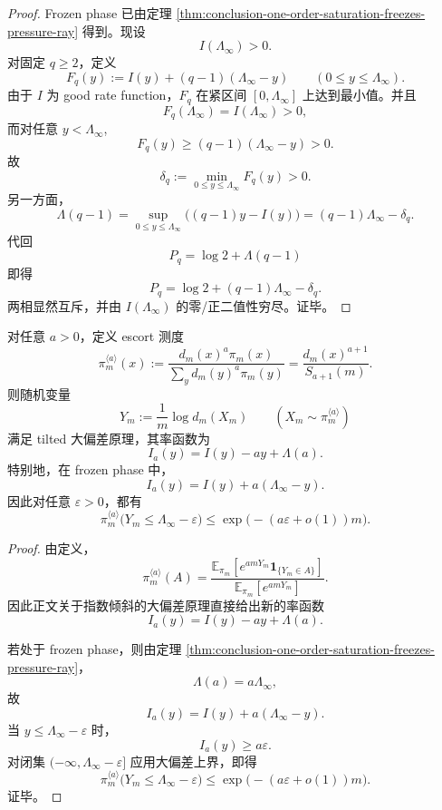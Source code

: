 \begin{proof}
Frozen phase 已由定理 \ref{thm:conclusion-one-order-saturation-freezes-pressure-ray} 得到。现设
\[
I(\Lambda_\infty)>0.
\]
对固定 \(q\ge 2\)，定义
\[
F_q(y):=I(y)+(q-1)(\Lambda_\infty-y)
\qquad (0\le y\le \Lambda_\infty).
\]
由于 \(I\) 为 good rate function，\(F_q\) 在紧区间 \([0,\Lambda_\infty]\) 上达到最小值。并且
\[
F_q(\Lambda_\infty)=I(\Lambda_\infty)>0,
\]
而对任意 \(y<\Lambda_\infty\),
\[
F_q(y)\ge (q-1)(\Lambda_\infty-y)>0.
\]
故
\[
\delta_q:=\min_{0\le y\le \Lambda_\infty}F_q(y)>0.
\]
另一方面，
\[
\Lambda(q-1)
=
\sup_{0\le y\le \Lambda_\infty}\bigl((q-1)y-I(y)\bigr)
=
(q-1)\Lambda_\infty-\delta_q.
\]
代回
\[
P_q=\log 2+\Lambda(q-1)
\]
即得
\[
P_q=\log 2+(q-1)\Lambda_\infty-\delta_q.
\]
两相显然互斥，并由 \(I(\Lambda_\infty)\) 的零/正二值性穷尽。证毕。
\end{proof}

\begin{theorem}\label{thm:conclusion-escort-tilted-ldp-maxfiber-attractor}
对任意 \(a>0\)，定义 escort 测度
\[
\pi_m^{\langle a\rangle}(x)
:=
\frac{d_m(x)^a\pi_m(x)}{\sum_{y}d_m(y)^a\pi_m(y)}
=
\frac{d_m(x)^{a+1}}{S_{a+1}(m)}.
\]
则随机变量
\[
Y_m:=\frac{1}{m}\log d_m(X_m)
\qquad (X_m\sim \pi_m^{\langle a\rangle})
\]
满足 tilted 大偏差原理，其率函数为
\[
I_a(y)=I(y)-ay+\Lambda(a).
\]
特别地，在 frozen phase 中，
\[
I_a(y)=I(y)+a(\Lambda_\infty-y).
\]
因此对任意 \(\varepsilon>0\)，都有
\[
\pi_m^{\langle a\rangle}\!\bigl(Y_m\le \Lambda_\infty-\varepsilon\bigr)
\le
\exp\!\bigl(-(a\varepsilon+o(1))m\bigr).
\]
\end{theorem}

\begin{proof}
由定义，
\[
\pi_m^{\langle a\rangle}(A)
=
\frac{\mathbb E_{\pi_m}\!\left[e^{amY_m}\mathbf 1_{\{Y_m\in A\}}\right]}
{\mathbb E_{\pi_m}\!\left[e^{amY_m}\right]}.
\]
因此正文关于指数倾斜的大偏差原理直接给出新的率函数
\[
I_a(y)=I(y)-ay+\Lambda(a).
\]

若处于 frozen phase，则由定理 \ref{thm:conclusion-one-order-saturation-freezes-pressure-ray}，
\[
\Lambda(a)=a\Lambda_\infty,
\]
故
\[
I_a(y)=I(y)+a(\Lambda_\infty-y).
\]
当 \(y\le \Lambda_\infty-\varepsilon\) 时，
\[
I_a(y)\ge a\varepsilon.
\]
对闭集 \((-\infty,\Lambda_\infty-\varepsilon]\) 应用大偏差上界，即得
\[
\pi_m^{\langle a\rangle}\!\bigl(Y_m\le \Lambda_\infty-\varepsilon\bigr)
\le
\exp\!\bigl(-(a\varepsilon+o(1))m\bigr).
\]
证毕。
\end{proof}

